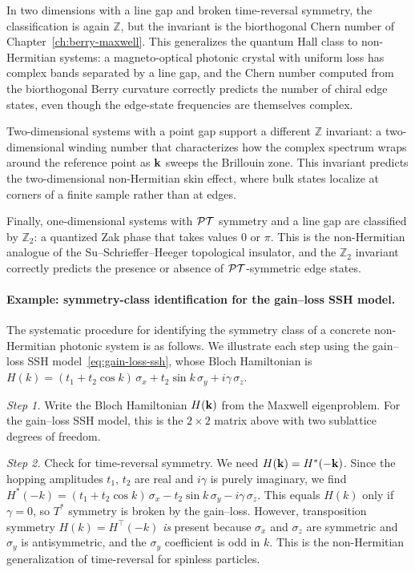 In two dimensions with a line gap and broken time-reversal symmetry, the
classification is again $\mathbb{Z}$, but the invariant is the
biorthogonal Chern number of Chapter~\ref{ch:berry-maxwell}. This
generalizes the quantum Hall class to non-Hermitian systems: a magneto-optical
photonic crystal with uniform loss has complex bands separated by a line
gap, and the Chern number computed from the biorthogonal Berry
curvature correctly predicts the number of chiral edge states, even
though the edge-state frequencies are themselves complex.

Two-dimensional systems with a point gap support a different
$\mathbb{Z}$ invariant: a two-dimensional winding number that
characterizes how the complex spectrum wraps around the reference point
as $\mathbf{k}$ sweeps the Brillouin zone. This invariant predicts the
two-dimensional non-Hermitian skin effect, where bulk states localize
at corners of a finite sample rather than at edges.

Finally, one-dimensional systems with $\mathcal{PT}$ symmetry and a line gap are
classified by $\mathbb{Z}_2$: a quantized Zak phase that takes values
$0$ or $\pi$. This is the non-Hermitian analogue of the Su--Schrieffer--Heeger
topological insulator, and the $\mathbb{Z}_2$ invariant correctly
predicts the presence or absence of $\mathcal{PT}$-symmetric edge states.

\paragraph{Example: symmetry-class identification for the
gain--loss SSH model.}
The systematic procedure for identifying the symmetry class of a
concrete non-Hermitian photonic system is as follows. We illustrate
each step using the gain--loss SSH model~\eqref{eq:gain-loss-ssh},
whose Bloch Hamiltonian is
$H(k) = (t_1 + t_2 \cos k)\,\sigma_x + t_2 \sin k\,\sigma_y
+ i\gamma\,\sigma_z$.

\emph{Step 1.} Write the Bloch Hamiltonian $H(\mathbf{k})$ from the Maxwell
eigenproblem. For the gain--loss SSH model, this is the $2\times 2$
matrix above with two sublattice degrees of freedom.

\emph{Step 2.} Check for time-reversal symmetry. We need
$H(\mathbf{k}) = H^*(-\mathbf{k})$. Since the hopping amplitudes $t_1$, $t_2$ are
real and $i\gamma$ is purely imaginary, we find
$H^*(-k) = (t_1 + t_2\cos k)\,\sigma_x - t_2\sin k\,\sigma_y
- i\gamma\,\sigma_z$. This equals $H(k)$ only if $\gamma = 0$, so
$T^*$ symmetry is broken by the gain--loss. However, transposition
symmetry $H(k) = H^\top(-k)$ \emph{is} present because $\sigma_x$ and
$\sigma_z$ are symmetric and $\sigma_y$ is antisymmetric, and the
$\sigma_y$ coefficient is odd in $k$. This is the non-Hermitian
generalization of time-reversal for spinless particles.

